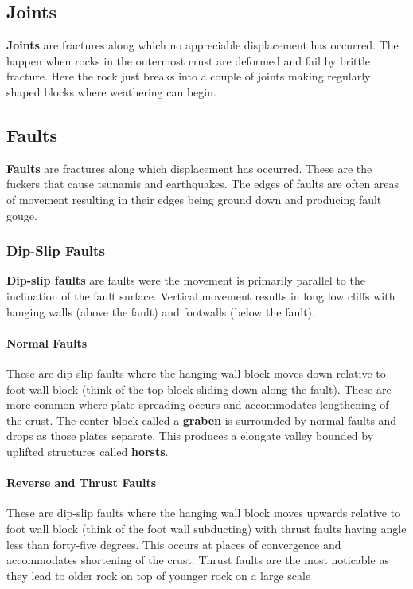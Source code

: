 \documentclass{article}
\begin{document}
\subsection{Joints} %
\label{sub:joints}
\textbf{Joints} are fractures along which no appreciable displacement has occurred. The happen when rocks in the outermost crust are deformed and fail by brittle fracture. Here the rock just breaks into a couple of joints making regularly shaped blocks where weathering can begin.

\subsection{Faults} %
\label{sub:faults}
\textbf{Faults} are fractures along which displacement has occurred. These are the fuckers that cause tsunamis and earthquakes. The edges of faults are often areas of movement resulting in their edges being ground down and producing fault gouge.

\subsubsection{Dip-Slip Faults} %
\label{sub:dip_slip_faults}
\textbf{Dip-slip faults} are faults were the movement is primarily parallel to the inclination of the fault surface. Vertical movement results in long low cliffs with hanging walls (above the fault) and footwalls (below the fault).

\paragraph{Normal Faults} %
\label{par:normal_faults}
These are dip-slip faults where the hanging wall block moves down relative to foot wall block (think of the top block sliding down along the fault). These are more common where plate spreading occurs and accommodates lengthening of the crust. The center block called a \textbf{graben} is surrounded by normal faults and drops as those plates separate. This produces a elongate valley bounded by uplifted structures called \textbf{horsts}.

\paragraph{Reverse and Thrust Faults} %
\label{par:reverse_and_thrust_faults}
These are dip-slip faults where the hanging wall block moves upwards relative to foot wall block (think of the foot wall subducting) with thrust faults having angle less than forty-five degrees. This occurs at places of convergence and accommodates shortening of the crust. Thrust faults are the most noticable as they lead to older rock on top of younger rock on a large scale
\end{document}
